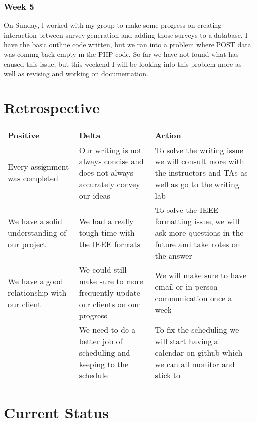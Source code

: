 \documentclass[letterpaper,10pt,serif, draftclsnofoot,onecolumn, compsoc, titlepage]{IEEEtran}
\begin{document}
\subsubsection{Week 5}
On Sunday, I worked with my group to make some progress on creating interaction between survey generation and adding those surveys to a database.
I have the basic outline code written, but we ran into a problem where POST data was coming back empty in the PHP code.
So far we have not found what has caused this issue, but this weekend I will be looking into this problem more as well as revising and working on documentation.

\section{Retrospective}
\begin{center}
    \begin{tabular}{ | p{5cm} | p{5cm} | p{5cm} |}
    \hline
     Positive & Delta & Action \\ \hline
  	Every assignment was completed & Our writing is not always concise and does not always accurately convey our ideas & To solve the writing issue we will consult more with the instructors and TAs as well as go to the writing lab \\\hline
	We have a solid understanding of our project & We had a really tough time with the IEEE formats & To solve the IEEE formatting issue, we will ask more questions in the future and take notes on the answer \\ \hline
	We have a good relationship with our client & We could still make sure to more frequently update our clients on our progress & We will make sure to have email or in-person communication once a week \\ \hline
	&We need to do a better job of scheduling and keeping to the schedule& To fix the scheduling we will start having a calendar on github which we can all monitor and stick to \\ \hline
    \end{tabular}
\end{center}

\section{Current Status}
\end{document}
